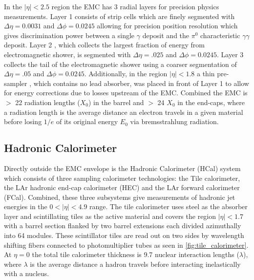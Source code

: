 In the $|\eta| < 2.5$ region the EMC has 3 radial layers for precision physics
measurements.  Layer 1 consists of strip cells which are finely segmented with
$\Delta\eta = 0.0031$ and $\Delta\phi = 0.0245$ allowing for precision position
resolution which gives discrimination power between a single $\gamma$ deposit
and the $\pi^0$ characteristic $\gamma\gamma$ deposit. Layer 2 , which collects
the largest fraction of energy from electromagnetic shower, is segmented with
$\Delta\eta = .025$ and $\Delta\phi = 0.0245$. Layer 3 collects the tail of the
electromagnetic shower using a coarser segmentation of $\Delta\eta = .05$ and
$\Delta\phi = 0.0245$.  Additionally, in the region $|\eta| < 1.8$ a thin
pre-sampler , which contains no lead absorber, was placed in front of Layer 1 to
allow for energy corrections due to losses upstream of the EMC.  Combined the
EMC is $>$ 22 radiation lengths ($X_0$) in the barrel and $>$ 24 $X_0$ in the
end-caps, where a radiation length is the average distance an electron travels
in a given material before losing $1/e$ of its original energy $E_0$ via
bremsstrahlung radiation.

\subsection{Hadronic Calorimeter}

Directly outside the EMC envelope is the Hadronic Calorimeter (HCal) system
\cite{PERF-2007-01} which consists of three sampling calorimeter technologies:
the Tile calorimeter, the LAr hadronic end-cap calorimeter (HEC) and the LAr
forward calorimeter (FCal).  Combined, these three subsystems give measurements
of hadronic jet energies in the $0 <|\eta| < 4.9$ range. The tile calorimeter
uses steel as the absorber layer and scintillating tiles as the active material
and covers the region $|\eta| < 1.7$ with a barrel section flanked by two barrel
extensions each divided azimuthally into 64 modules.  These scintillator tiles
are read out on two sides by wavelength shifting fibers connected to
photomultiplier tubes as seen in \cref{fig:tile_calorimeter}. At $\eta =
0$ the total tile calorimeter thickness is 9.7 nuclear interaction lengths
($\lambda$), where $\lambda$ is the average distance a hadron travels before
interacting inelastically with a nucleus.

